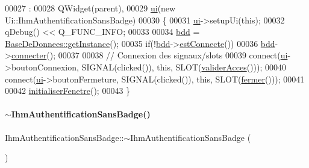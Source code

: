 \begin{DoxyCode}
00027                                                                           :
00028     QWidget(parent),
00029     \hyperlink{class_ihm_authentification_sans_badge_a95e8a9d049b6e5f262b45e3362d2bbee}{ui}(\textcolor{keyword}{new} Ui::IhmAuthentificationSansBadge)
00030 \{
00031     \hyperlink{class_ihm_authentification_sans_badge_a95e8a9d049b6e5f262b45e3362d2bbee}{ui}->setupUi(\textcolor{keyword}{this});
00032     qDebug() << Q\_FUNC\_INFO;
00033 
00034     \hyperlink{class_ihm_authentification_sans_badge_acf93b261335b6128af77de61994b9491}{bdd} = \hyperlink{class_base_de_donnees_a80028aa2b6b4fbf30fb2e36357b7d3d3}{BaseDeDonnees::getInstance}();
00035     \textcolor{keywordflow}{if}(!\hyperlink{class_ihm_authentification_sans_badge_acf93b261335b6128af77de61994b9491}{bdd}->\hyperlink{class_base_de_donnees_a00388973f3ec42e5c8e76e7af7e124b2}{estConnecte}())
00036         \hyperlink{class_ihm_authentification_sans_badge_acf93b261335b6128af77de61994b9491}{bdd}->\hyperlink{class_base_de_donnees_ac20da193923a9bfea5e38ee5a54820cd}{connecter}();
00037 
00038     \textcolor{comment}{// Connexion des signaux/slots}
00039     connect(\hyperlink{class_ihm_authentification_sans_badge_a95e8a9d049b6e5f262b45e3362d2bbee}{ui}->boutonConnexion, SIGNAL(clicked()), \textcolor{keyword}{this}, SLOT(\hyperlink{class_ihm_authentification_sans_badge_a1d6f062da30edd3ba8fe74906e8f16cf}{validerAcces}()));
00040     connect(\hyperlink{class_ihm_authentification_sans_badge_a95e8a9d049b6e5f262b45e3362d2bbee}{ui}->boutonFermeture, SIGNAL(clicked()), \textcolor{keyword}{this}, SLOT(\hyperlink{class_ihm_authentification_sans_badge_aa06ddc2a4b8d578fecfb9e37dd577858}{fermer}()));
00041 
00042     \hyperlink{class_ihm_authentification_sans_badge_a5804d43d13e39e3e4890f7b08c89cb6c}{initialiserFenetre}();
00043 \}
\end{DoxyCode}
\mbox{\label{class_ihm_authentification_sans_badge_a39197686724a0ad151c0c998301c198e}} 
\paragraph{\texorpdfstring{$\sim$\+Ihm\+Authentification\+Sans\+Badge()}{~IhmAuthentificationSansBadge()}}
{\footnotesize\ttfamily Ihm\+Authentification\+Sans\+Badge\+::$\sim$\+Ihm\+Authentification\+Sans\+Badge (\begin{DoxyParamCaption}{ }\end{DoxyParamCaption})}



